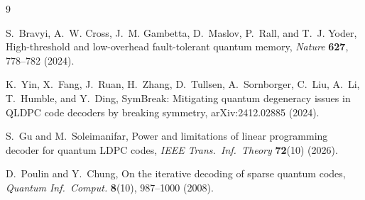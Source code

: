 \documentclass[10pt]{article}
\begin{document}
\begin{thebibliography}{9}

S.~Bravyi, A.~W. Cross, J.~M. Gambetta, D.~Maslov, P.~Rall, and
T.~J. Yoder,
\newblock High-threshold and low-overhead fault-tolerant quantum
memory,
\newblock \emph{Nature} \textbf{627}, 778--782 (2024).

K.~Yin, X.~Fang, J.~Ruan, H.~Zhang, D.~Tullsen, A.~Sornborger,
C.~Liu, A.~Li, T.~Humble, and Y.~Ding,
\newblock SymBreak: Mitigating quantum degeneracy issues in QLDPC code
decoders by breaking symmetry,
\newblock arXiv:2412.02885 (2024).

S.~Gu and M.~Soleimanifar,
\newblock Power and limitations of linear programming decoder for
quantum LDPC codes,
\newblock \emph{IEEE Trans.\ Inf.\ Theory} \textbf{72}(10) (2026).

D.~Poulin and Y.~Chung,
\newblock On the iterative decoding of sparse quantum codes,
\newblock \emph{Quantum Inf.\ Comput.} \textbf{8}(10), 987--1000
(2008).

\end{thebibliography}
\end{document}
